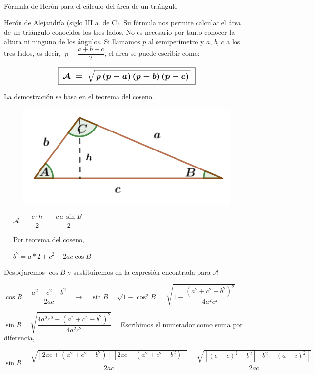 \begin{myalertblock}{Fórmula de Herón para el cálculo del área de un triángulo}

\vspace{2mm} Herón de Alejandría (siglo III a. de C). Su fórmula nos permite calcular el área de un triángulo conocidos los tres lados. No es necesario por tanto conocer la altura ni ninguno de los ángulos. Si llamamos $p$ al semiperímetro y $a$, $b$, $c$ a los tres lados, es decir,
$\ p=\dfrac{a+b+c}{2}$, el área se puede escribir como:


$$\large{ \boxed{ \  \boldsymbol{\mathcal A \ = \ \sqrt{\, p\, (p-a)\, (p-b)\, (p-c)\, }} \ } }$$

\vspace{2mm} La demostración se basa en el teorema del coseno.

\begin{multicols}{2}
\begin{figure}[H]
	\centering
	\includegraphics[width=.4\textwidth]{img-triang/triang13.png}
\end{figure}

$\quad$ $\mathcal A \ = \ \dfrac{c\cdot h}{2}\ = \ \dfrac{c\, a\, \sin B}{2}$

\vspace{2mm}$\quad$  Por teorema del coseno, 

\vspace{2mm}$\quad$  $b^2=a*2+c^2-2ac\cos B$	
\end{multicols}
\vspace{-4mm} Despejaremos $\cos B$ y sustituiremos en la expresión encontrada para  $\mathcal A$

\vspace{2mm} $\cos B=\dfrac{a^2+c^2-b^2}{2ac}\quad \to \quad \sin B=\sqrt{1-\cos^2 B} =\sqrt{1-\dfrac{(a^2+c^2-b^2)^2}{4a^2c^2}}$

\vspace{2mm}$\sin B=\sqrt{\dfrac{4a^2c^2-(a^2+c^2-b^2)^2}{4a^2c^2}}\quad $ Escribimos el numerador como  suma por diferencia,

\vspace{2mm} $\sin B=\dfrac{\sqrt{[2ac+(a^2+c^2-b^2)]\, [2ac-(a^2+c^2-b^2)]}}{2ac} = \dfrac{\sqrt{[(a+c)^2-b^2]\,[b^2-(a-c)^2]}}{2ac}$


\end{myalertblock}
